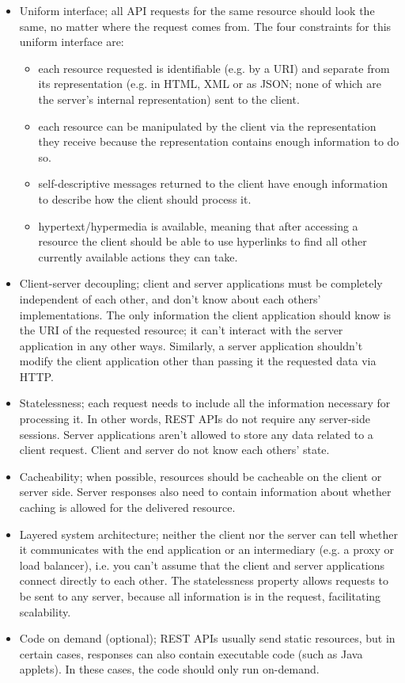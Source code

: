 \documentclass[8pt, table, xcdraw]{article}%
\begin{document}
\begin{itemize}
    \item Uniform interface; all API requests for the same resource should look the same, no matter where the request comes from. The four constraints for this uniform interface are:
    \begin{itemize}
        \item each resource requested is identifiable (e.g. by a URI) and separate from its representation (e.g. in HTML, XML or as JSON; none of which are the server's internal representation) sent to the client.
        \item each resource can be manipulated by the client via the representation they receive because the representation contains enough information to do so.
        \item self-descriptive messages returned to the client have enough information to describe how the client should process it.
        \item hypertext/hypermedia is available, meaning that after accessing a resource the client should be able to use hyperlinks to find all other currently available actions they can take.
    \end{itemize}
    \item Client-server decoupling; client and server applications must be completely independent of each other, and don't know about each others' implementations. The only information the client application should know is the URI of the requested resource; it can't interact with the server application in any other ways. Similarly, a server application shouldn't modify the client application other than passing it the requested data via HTTP.
    \item Statelessness; each request needs to include all the information necessary for processing it. In other words, REST APIs do not require any server-side sessions. Server applications aren’t allowed to store any data related to a client request. Client and server do not know each others' state.
    \item Cacheability; when possible, resources should be cacheable on the client or server side. Server responses also need to contain information about whether caching is allowed for the delivered resource.
    \item Layered system architecture; neither the client nor the server can tell whether it communicates with the end application or an intermediary (e.g. a proxy or load balancer), i.e. you can't assume that the client and server applications connect directly to each other. The statelessness property allows requests to be sent to any server, because all information is in the request, facilitating scalability.
    \item Code on demand (optional); REST APIs usually send static resources, but in certain cases, responses can also contain executable code (such as Java applets). In these cases, the code should only run on-demand.
\end{itemize}
\end{document}
